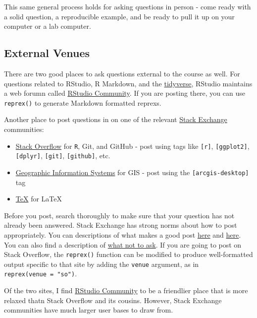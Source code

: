 \documentclass[]{book}
\providecommand{\tightlist}{%
  \setlength{\itemsep}{0pt}\setlength{\parskip}{0pt}}
\theoremstyle{definition}
\theoremstyle{definition}
\theoremstyle{definition}
\theoremstyle{remark}
\begin{document}
This same general process holds for asking questions in person - come
ready with a solid question, a reproducible example, and be ready to
pull it up on your computer or a lab computer.

\subsection{External Venues}\label{external-venues}

There are two good places to ask questions external to the course as
well. For questions related to RStudio, R Markdown, and the
\href{http://tidyverse.org}{tidyverse}, RStudio maintains a web forumn
called \href{https://community.rstudio.com}{RStudio Community}. If you
are posting there, you can use \texttt{reprex()} to generate Markdown
formatted reprexs.

Another place to post questions in on one of the relevant
\href{https://stackexchange.com}{Stack Exchange} communities:

\begin{itemize}
\tightlist
\item
  \href{https://stackoverflow.com}{Stack Overflow} for \texttt{R}, Git,
  and GitHub - post using tags like \texttt{{[}r{]}},
  \texttt{{[}ggplot2{]}}, \texttt{{[}dplyr{]}}, \texttt{{[}git{]}},
  \texttt{{[}github{]}}, etc.
\item
  \href{https://gis.stackexchange.com}{Geographic Information Systems}
  for GIS - post using the \texttt{{[}arcgis-desktop{]}} tag
\item
  \href{https://tex.stackexchange.com}{TeX} for LaTeX
\end{itemize}

Before you post, search thoroughly to make sure that your question has
not already been answered. Stack Exchange has strong norms about how to
post appropriately. You can descriptions of what makes a good post
\href{https://codereview.stackexchange.com/help/how-to-ask}{here} and
\href{https://stackoverflow.com/help/how-to-ask}{here}. You can also
find a description of
\href{https://stackoverflow.com/help/dont-ask}{what not to ask}. If you
are going to post on Stack Overflow, the \texttt{reprex()} function can
be modified to produce well-formatted output specific to that site by
adding the \texttt{venue} argument, as in
\texttt{reprex(venue\ =\ "so")}.

Of the two sites, I find \href{https://community.rstudio.com}{RStudio
Community} to be a friendlier place that is more relaxed thatn Stack
Overflow and its cousins. However, Stack Exchange communities have much
larger user bases to draw from.


\end{document}
